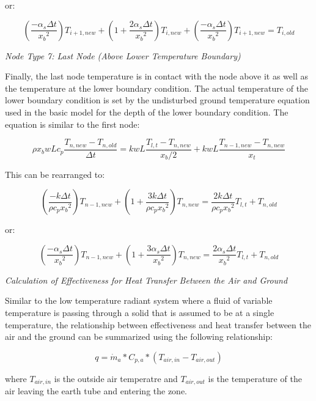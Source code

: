 or:

\begin{equation}
(\frac{-\alpha_s \Delta t}{{x_b}^2}) T_{i+1,new} + (1 + \frac{2 \alpha_s \Delta t}{{x_b}^2}) T_{i,new} + (\frac{-\alpha_s \Delta t}{{x_b}^2}) T_{i+1,new} = T_{i,old}
\end{equation}

\emph{\textit{Node Type 7: Last Node (Above Lower Temperature Boundary)}}

Finally, the last node temperature is in contact with the node above it as well as the temperature at the lower boundary condition.  The actual temperature of the lower boundary condition is set by the undisturbed ground temperature equation used in the basic model for the depth of the lower boundary condition.  The equation is similar to the first node:

\begin{equation}
\rho x_b w L c_p \frac{T_{n,new} - T_{n,old}}{\Delta t} = k w L \frac{T_{l,t} - T_{n,new}}{x_b / 2} + k w L \frac{T_{n-1,new} - T_{n,new}}{x_t}
\end{equation}

This can be rearranged to:

\begin{equation}
(\frac{-k \Delta t}{\rho c_p {x_b}^2}) T_{n-1,new} + (1 + \frac{3 k \Delta t}{\rho c_p {x_b}^2}) T_{n,new} = \frac{2 k \Delta t}{\rho c_p {x_b}^2} T_{l,t} + T_{n,old}
\end{equation}

or:

\begin{equation}
(\frac{-\alpha_s \Delta t}{{x_b}^2}) T_{n-1,new} + (1 + \frac{3 \alpha_s \Delta t}{{x_b}^2}) T_{n,new} = \frac{2 \alpha_s \Delta t}{{x_b}^2} T_{l,t} + T_{n,old}
\end{equation}

\emph{\textit{Calculation of Effectiveness for Heat Transfer Between the Air and Ground}}

Similar to the low temperature radiant system where a fluid of variable temperature is passing through a solid that is assumed to be at a single temperature, the relationship between effectiveness and heat transfer between the air and the ground can be summarized using the following relationship:

\begin{equation}
q = \dot m_a * C_{p,a} * (T_{air,in} - T_{air,out})
\end{equation}

where \(T_{air,in}\) is the outside air temperatre and \(T_{air,out}\) is the temperature of the air leaving the earth tube and entering the zone.

